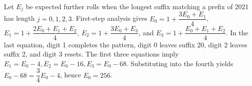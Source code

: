 Let $E_j$ be expected further rolls when the longest suffix matching a prefix of 2021 has length $j=0,1,2,3$. First-step analysis gives $E_0=1+\dfrac{3E_0+E_1}{4}$, $E_1=1+\dfrac{2E_0+E_1+E_2}{4}$, $E_2=1+\dfrac{3E_0+E_3}{4}$, and $E_3=1+\dfrac{E_0+E_1+E_2}{4}$. In the last equation, digit 1 completes the pattern, digit 0 leaves suffix 20, digit 2 leaves suffix 2, and digit 3 resets. The first three equations imply $E_1=E_0-4,E_2=E_0-16,E_3=E_0-68$. Substituting into the fourth yields $E_0-68=\dfrac{3}{4}E_0-4$, hence $\boxed{E_0=256}$.
